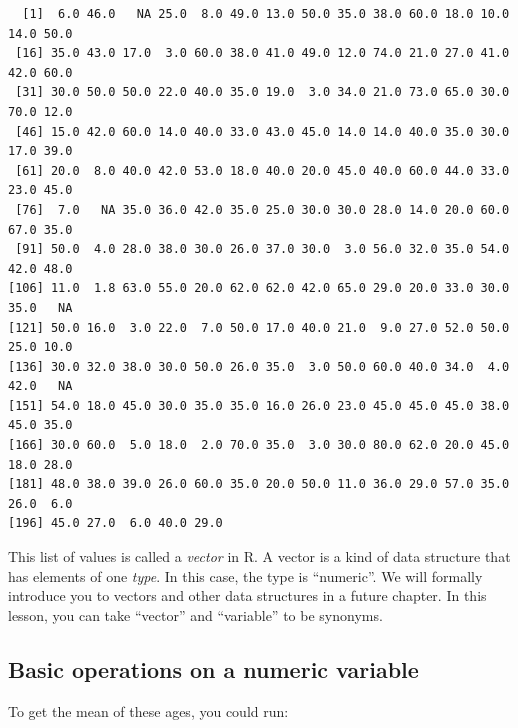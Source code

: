 \documentclass[
  letterpaper,
  DIV=11,
  numbers=noendperiod]{scrreprt}
\begin{document}
\begin{verbatim}
  [1]  6.0 46.0   NA 25.0  8.0 49.0 13.0 50.0 35.0 38.0 60.0 18.0 10.0 14.0 50.0
 [16] 35.0 43.0 17.0  3.0 60.0 38.0 41.0 49.0 12.0 74.0 21.0 27.0 41.0 42.0 60.0
 [31] 30.0 50.0 50.0 22.0 40.0 35.0 19.0  3.0 34.0 21.0 73.0 65.0 30.0 70.0 12.0
 [46] 15.0 42.0 60.0 14.0 40.0 33.0 43.0 45.0 14.0 14.0 40.0 35.0 30.0 17.0 39.0
 [61] 20.0  8.0 40.0 42.0 53.0 18.0 40.0 20.0 45.0 40.0 60.0 44.0 33.0 23.0 45.0
 [76]  7.0   NA 35.0 36.0 42.0 35.0 25.0 30.0 30.0 28.0 14.0 20.0 60.0 67.0 35.0
 [91] 50.0  4.0 28.0 38.0 30.0 26.0 37.0 30.0  3.0 56.0 32.0 35.0 54.0 42.0 48.0
[106] 11.0  1.8 63.0 55.0 20.0 62.0 62.0 42.0 65.0 29.0 20.0 33.0 30.0 35.0   NA
[121] 50.0 16.0  3.0 22.0  7.0 50.0 17.0 40.0 21.0  9.0 27.0 52.0 50.0 25.0 10.0
[136] 30.0 32.0 38.0 30.0 50.0 26.0 35.0  3.0 50.0 60.0 40.0 34.0  4.0 42.0   NA
[151] 54.0 18.0 45.0 30.0 35.0 35.0 16.0 26.0 23.0 45.0 45.0 45.0 38.0 45.0 35.0
[166] 30.0 60.0  5.0 18.0  2.0 70.0 35.0  3.0 30.0 80.0 62.0 20.0 45.0 18.0 28.0
[181] 48.0 38.0 39.0 26.0 60.0 35.0 20.0 50.0 11.0 36.0 29.0 57.0 35.0 26.0  6.0
[196] 45.0 27.0  6.0 40.0 29.0
\end{verbatim}

\begin{tcolorbox}[enhanced jigsaw, title=\textcolor{quarto-callout-note-color}{\faInfo}\hspace{0.5em}{Vocab}, colbacktitle=quarto-callout-note-color!10!white, leftrule=.75mm, arc=.35mm, opacityback=0, bottomrule=.15mm, rightrule=.15mm, toptitle=1mm, breakable, toprule=.15mm, colback=white, coltitle=black, colframe=quarto-callout-note-color-frame, bottomtitle=1mm, titlerule=0mm, left=2mm, opacitybacktitle=0.6]

This list of values is called a \emph{vector} in R. A vector is a kind
of data structure that has elements of one \emph{type}. In this case,
the type is ``numeric''. We will formally introduce you to vectors and
other data structures in a future chapter. In this lesson, you can take
``vector'' and ``variable'' to be synonyms.

\end{tcolorbox}

\subsection{Basic operations on a numeric
variable}\label{basic-operations-on-a-numeric-variable}

To get the mean of these ages, you could run:
\end{document}
